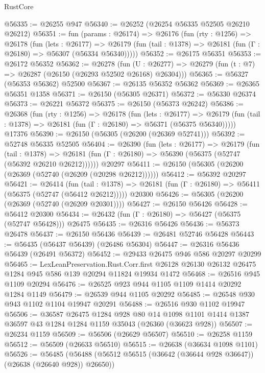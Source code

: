 \begin{lexlean}{RustCore}
\begin{coremodule}
@56335 := @26255 @947
@56340 := @26252 (@26254 @56335 @52505 @26210 @26212)
@56351 := fun (params : @26174) =>
  @26176
    (fun (rty : @1256) =>
    @26178
      (fun (lets : @26177) =>
      @26179 (fun (tail : @1378) => @26181 (fun (Γ : @26180) => @56307 (@56334 @56340)))))
@56352 := @26175 @56351
@56353 := @26172 @56352
@56362 := @26278
    (fun (U : @26277) => @26279 (fun (t : @7) => @26287 (@26150 (@26293 @52502 @26168) @26304)))
@56365 := @56327 (@56353 @56362) @52500
@56367 := @26135 @56352 @56362
@56369 := @26365 @56351 @1358
@56371 := @26150 (@56305 @26371)
@56372 := @56330 @26374
@56373 := @26221 @56372
@56375 := @26150 (@56373 @26242)
@56386 := @26368
    (fun (rty : @1256) =>
    @26178
      (fun (lets : @26177) =>
      @26179 (fun (tail : @1378) => @26181 (fun (Γ : @26180) => @56371 (@56375 @56340)))))
    @17376
@56390 := @26150 (@56305 (@26200 (@26369 @52741)))
@56392 := @52748 @56335 @52505
@56404 := @26390
    (fun (lets : @26177) =>
    @26179
      (fun (tail : @1378) =>
      @26181 (fun (Γ : @26180) => @56390 (@56375 (@52747 (@56392 @26210 @26212))))))
    @20297
@56411 := @26150 (@56305 (@26200 (@26369 (@52740 (@26209 (@20298 @26212))))))
@56412 := @56392 @20297
@56421 := @26414
    (fun (tail : @1378) => @26181 (fun (Γ : @26180) => @56411 (@56375 (@52747 (@56412 @26212)))))
    @20300
@56426 := @56305 (@26200 (@26369 (@52740 (@26209 @20301))))
@56427 := @26150 @56426
@56428 := @56412 @20300
@56434 := @26432 (fun (Γ : @26180) => @56427 (@56375 (@52747 @56428))) @26475
@56435 := @26316 @56426
@56436 := @56373 @26478
@56437 := @26150 @56436
@56439 := @26481 @52746 @56428
@56443 := @56435 (@56437 @56439) (@26486 @56304)
@56447 := @26316 @56436 @56439 (@26491 @56372)
@56452 := @29433 @26475 @946 @586 @20297 @20299
@56465 := LexLeanPreservation.Rust.Corr.first
    @26128
    @26130
    @26132
    @26475
    @1284
    @945
    @586
    @139
    @20294
    @11824
    @19934
    @1472
@56468 := @26516 @945 @1109 @20294
@56476 := @26525 @923 @944 @1105 @1109 @1414 @20292 @1284 @1149
@56479 := @26539 @944 @1105 @20292
@56485 := @26548 @930 @943 @1102 @1104 @19947 @20291
@56488 := @26516 @930 @1102 @19947
@56506 := @36587
    @26475
    @1284
    @928
    @80
    @14
    @1098
    @1101
    @1414
    @1387
    @36597
    @43
    @1284
    @1284
    @1159
    @35043
    (@26360 (@36623 @928))
@56507 := @26234 @1159
@56509 := @56506 (@26629 @56507)
@56510 := @26258 @1159
@56512 := @56509 (@26633 @56510)
@56515 := @26638 (@36634 @1098 @1101)
@56526 := @56485
    (@56488 (@56512 @56515 (@36642 (@36644 @928 @36647)) (@26638 (@26640 @928)) @26650))

\end{coremodule}
\end{lexlean}

